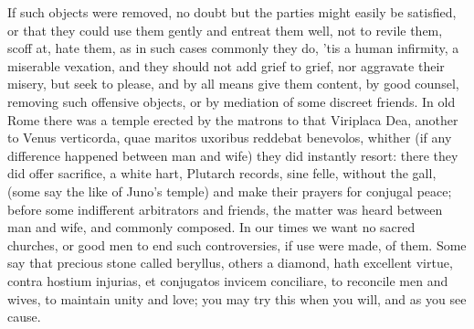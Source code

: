 If such objects were removed, no doubt but the parties might easily be
satisfied, or that they could use them gently and entreat them well,
not to revile them, scoff at, hate them, as in such cases commonly they
do, 'tis a human infirmity, a miserable vexation, and they should not
add grief to grief, nor aggravate their misery, but seek to please, and
by all means give them content, by good counsel, removing such
offensive objects, or by mediation of some discreet friends. In old
Rome there was a temple erected by the matrons to that Viriplaca
Dea, another to Venus verticorda, quae maritos uxoribus reddebat
benevolos, whither (if any difference happened between man and wife)
they did instantly resort: there they did offer sacrifice, a white
hart, Plutarch records, sine felle, without the gall, (some say the
like of Juno's temple) and make their prayers for conjugal peace;
before some  indifferent arbitrators and friends, the matter was
heard between man and wife, and commonly composed. In our times we want
no sacred churches, or good men to end such controversies, if use were
made, of them. Some say that precious stone called beryllus,
others a diamond, hath excellent virtue, contra hostium injurias, et
conjugatos invicem conciliare, to reconcile men and wives, to maintain
unity and love; you may try this when you will, and as you see cause.

